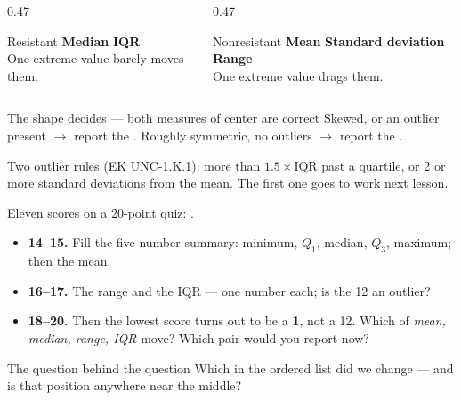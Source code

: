 \documentclass[aspectratio=169, 11pt]{beamer}
\begin{document}
\begin{frame}[t, plain]
  \vspace{4pt}
  \begin{columns}[t]
    \begin{column}{0.47\textwidth}
      \begin{block}{Resistant}
        \textbf{Median} \quad\textbf{IQR}\\[3pt]
        One extreme value barely moves them.
      \end{block}
    \end{column}
    \begin{column}{0.47\textwidth}
      \begin{block}{Nonresistant}
        \textbf{Mean} \quad\textbf{Standard deviation} \quad\textbf{Range}\\[3pt]
        One extreme value drags them.
      \end{block}
    \end{column}
  \end{columns}
  \vspace{10pt}
  \begin{block}{The shape decides --- both measures of center are correct}
    Skewed, or an outlier present $\to$ report the . \quad
    Roughly symmetric, no outliers $\to$ report the .
  \end{block}
  \vspace{4pt}
  {\small\color{slate} Two outlier rules (EK UNC-1.K.1): more than $1.5\times\text{IQR}$
  past a quartile, or 2 or more standard deviations from the mean. The first one goes to work
  next lesson.}
\end{frame}

\begin{frame}[t, plain]
  Eleven scores on a 20-point quiz:           .
  \begin{itemize}\setlength{\itemsep}{5pt}
    \item \textbf{14--15.} Fill the five-number summary: minimum, $Q_1$, median, $Q_3$, maximum;
          then the mean.
    \item \textbf{16--17.} The range and the IQR --- one number each; is the 12 an outlier?
    \item \textbf{18--20.} Then the lowest score turns out to be a \textbf{1}, not a 12. Which of
          \emph{mean, median, range, IQR} move? Which pair would you report now?
  \end{itemize}
  \begin{block}{The question behind the question}
    Which  in the ordered list did we change --- and is that position anywhere
    near the middle?
  \end{block}
\end{frame}
\end{document}
